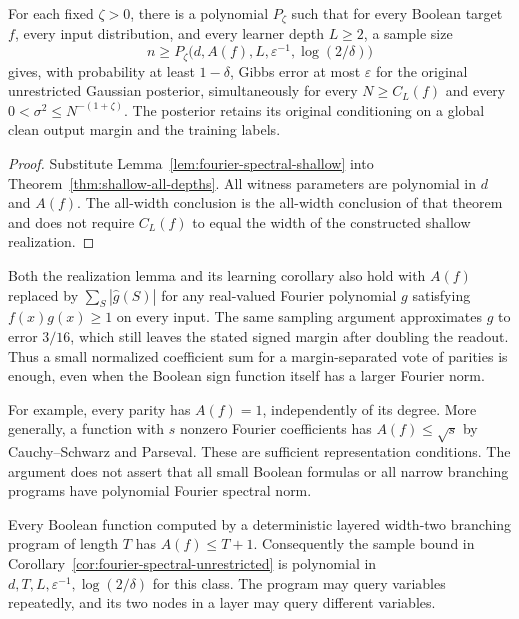 \begin{corollary}
\label{cor:fourier-spectral-unrestricted}
For each fixed $\zeta>0$, there is a polynomial $P_\zeta$ such that
for every Boolean target $f$, every input distribution, and every
learner depth $L\ge2$, a sample size
\[
 n\ge P_\zeta\bigl(d,A(f),L,\varepsilon^{-1},\log(2/\delta)\bigr)
\]
gives, with probability at least $1-\delta$, Gibbs error at most
$\varepsilon$ for the original unrestricted Gaussian posterior,
simultaneously for every $N\ge C_L(f)$ and every
$0<\sigma^2\le N^{-(1+\zeta)}$.
The posterior retains its original conditioning on a global clean
output margin and the training labels.
\end{corollary}

\begin{proof}
Substitute Lemma~\ref{lem:fourier-spectral-shallow} into
Theorem~\ref{thm:shallow-all-depths}. All witness parameters are
polynomial in $d$ and $A(f)$. The all-width conclusion is the
all-width conclusion of that theorem and does not require
$C_L(f)$ to equal the width of the constructed shallow realization.
\end{proof}

Both the realization lemma and its learning corollary also hold with
$A(f)$ replaced by $\sum_S|\widehat g(S)|$ for any real-valued Fourier
polynomial $g$ satisfying $f(x)g(x)\ge1$ on every input. The same
sampling argument approximates $g$ to error $3/16$, which still leaves
the stated signed margin after doubling the readout. Thus a small
normalized coefficient sum for a margin-separated vote of parities
is enough, even when the Boolean sign function itself has a larger
Fourier norm.

For example, every parity has $A(f)=1$, independently of its degree.
More generally, a function with $s$ nonzero Fourier coefficients has
$A(f)\le\sqrt s$ by Cauchy--Schwarz and Parseval. These are sufficient
representation conditions. The argument does not assert that all small
Boolean formulas or all narrow branching programs have polynomial
Fourier spectral norm.

\begin{corollary}
\label{cor:two-state-branching}
Every Boolean function computed by a deterministic layered width-two
branching program of length $T$ has $A(f)\le T+1$. Consequently the sample bound
in Corollary~\ref{cor:fourier-spectral-unrestricted} is polynomial in
$d,T,L,\varepsilon^{-1},\log(2/\delta)$ for this class.
The program may query variables repeatedly, and its two nodes in a
layer may query different variables.
\end{corollary}

